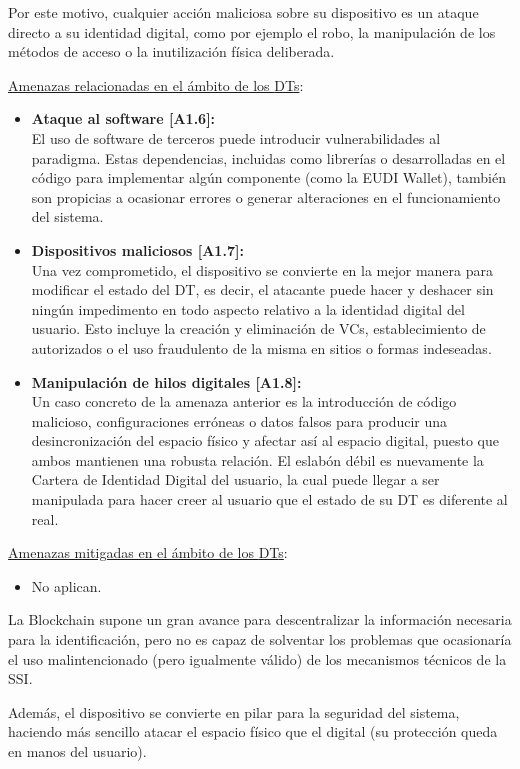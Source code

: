 \documentclass[../main.tex]{subfiles}
\begin{document}
\begin{enumerate}[label=\textbf{R1.\arabic*}, leftmargin=48pt]
    Por este motivo, cualquier acción maliciosa sobre su dispositivo es un ataque directo a su identidad digital, como por ejemplo el robo, la manipulación de los métodos de acceso o la inutilización física deliberada.   

    \underline{Amenazas relacionadas en el ámbito de los \acrshort{DT}s}:
    \begin{itemize}
        \item \textbf{Ataque al software [A1.6]:}\label{A1.6}
        \\ El uso de software de terceros puede introducir vulnerabilidades al paradigma. Estas dependencias, incluidas como librerías o desarrolladas en el código para implementar algún componente (como la \acrshort{EUDI Wallet}), también son propicias a ocasionar errores o generar alteraciones en el funcionamiento del sistema. 
        \item \textbf{Dispositivos maliciosos [A1.7]:}\label{A1.7}
        \\ Una vez comprometido, el dispositivo se convierte en la mejor manera para modificar el estado del \acrshort{DT}, es decir, el atacante puede hacer y deshacer sin ningún impedimento en todo aspecto relativo a la identidad digital del usuario. Esto incluye la creación y eliminación de \acrshort{VC}s, establecimiento de autorizados o el uso fraudulento de la misma en sitios o formas indeseadas. 
        \item \textbf{Manipulación de hilos digitales [A1.8]:}\label{A1.8}
        \\ Un caso concreto de la amenaza anterior es la introducción de código malicioso, configuraciones erróneas o datos falsos para producir una desincronización del espacio físico y afectar así al espacio digital, puesto que ambos mantienen una robusta relación. El eslabón débil es nuevamente la Cartera de Identidad Digital del usuario, la cual puede llegar a ser manipulada para hacer creer al usuario que el estado de su \acrshort{DT} es diferente al real.
    \end{itemize}
    
    \underline{Amenazas mitigadas en el ámbito de los \acrshort{DT}s}: 
    \begin{itemize}
        \item No aplican.
        \\
    \end{itemize} 
\end{enumerate}

\begin{tcolorbox}[colback=gray!10!white, colframe=gray!50!black, title=Análisis de la Capa \theanalisis]\label{analisis-C1}
La Blockchain supone un gran avance para descentralizar la información necesaria para la identificación, pero no es capaz de solventar los problemas que ocasionaría el uso malintencionado (pero igualmente válido) de los mecanismos técnicos de la \acrshort{SSI}. 

Además, el dispositivo se convierte en pilar para la seguridad del sistema, haciendo más sencillo atacar el espacio físico que el digital (su protección queda en manos del usuario). 
\end{tcolorbox}
\end{document}
